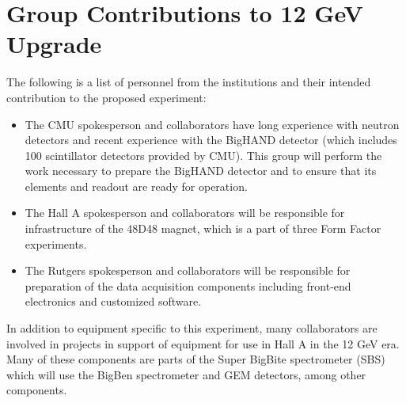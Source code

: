 \documentclass[12pt,letterpaper,oneside]{article}
\begin{document}
\section{Group Contributions to 12 GeV Upgrade}
The following is a list of personnel from the institutions and their intended
contribution to the proposed experiment:

\begin{itemize}


\item 
The CMU spokesperson and collaborators have long experience with neutron
  detectors and recent experience with the BigHAND detector (which
  includes 100 scintillator detectors provided by CMU).  This group
  will perform the work necessary to prepare the BigHAND detector and
  to ensure that its elements and readout are ready for operation.


\item 
The Hall A spokesperson and collaborators will be 
responsible for infrastructure of 
the 48D48 magnet, which is a part of three Form Factor experiments.

\item 
The Rutgers spokesperson and collaborators will be responsible
  for preparation of the data acquisition components including
  front-end electronics and customized software.



\end{itemize} 

In addition to equipment specific to this experiment, many
collaborators are involved in projects in support of equipment for use
in Hall A in the 12 GeV era.   Many of these components are parts of
the Super BigBite spectrometer (SBS) which will use the BigBen
spectrometer and GEM detectors, among other components.
\end{document}
